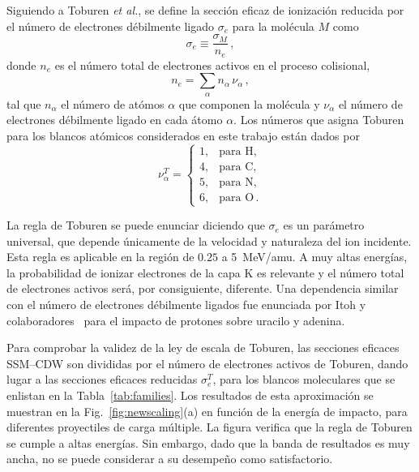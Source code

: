 Siguiendo a Toburen \textit{et al.}, se define la sección eficaz de 
ionización reducida por el número de electrones débilmente ligado 
$\sigma_e$ para la molécula $M$ como
\begin{equation}
\sigma_e\equiv\frac{\sigma_M}{n_e}\,, 
\label{eq:cross-ne} 
\end{equation}
donde $n_e$ es el número total de electrones activos en el proceso 
colisional, 
\begin{equation}
n_e=\sum_{\alpha}n_{\alpha}\,\nu_{\alpha}\,,
\end{equation} 
tal que $n_{\alpha}$ el número de atómos $\alpha$ que componen la 
molécula y $\nu_{\alpha}$ el número de electrones débilmente ligado en 
cada átomo $\alpha$. Los números que asigna Toburen para los blancos 
atómicos considerados en este trabajo están dados por 
\begin{equation}
\nu_{\alpha}^T=\left\{ 
\begin{array}{ll}
1, & \text{para H,} \\
4, & \text{para C,} \\ 
5, & \text{para N,} \\ 
6, & \text{para O}\,.
\end{array}\right.
\label{eq:neToburen} 
\end{equation} 

La regla de Toburen se puede enunciar diciendo que $\sigma_{e}$ es un 
parámetro universal, que depende únicamente de la velocidad y naturaleza
del ion incidente. Esta regla es aplicable en la región de $0.25$ a 
5~MeV/amu. A muy altas energías, la probabilidad de ionizar electrones 
de la capa K es relevante y el número total de electrones activos será, 
por consiguiente, diferente. Una dependencia similar con el número de 
electrones débilmente ligados fue enunciada por Itoh y 
colaboradores~\cite{itoh2013} 
para el impacto de protones sobre uracilo y adenina.

Para comprobar la validez de la ley de escala de Toburen, las secciones 
eficaces SSM--CDW son divididas por el número de electrones activos de 
Toburen, dando lugar a las secciones eficaces reducidas $\sigma_{e}^T$, 
para los blancos moleculares que se enlistan en la 
Tabla~\ref{tab:families}. Los resultados de esta aproximación se 
muestran en la Fig.~\ref{fig:newscaling}(a) en función de la energía de 
impacto, para diferentes proyectiles de carga múltiple. La figura 
verifica que la regla de Toburen se cumple a altas energías. Sin 
embargo, dado que la banda de resultados es muy ancha, no se puede 
considerar a su desempeño como satisfactorio.

